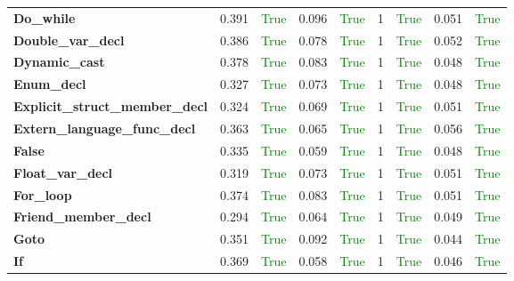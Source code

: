 \documentclass{article}
\begin{document}
\begin{xltabular}{\textwidth}{lcccccccc}
\textbf{{\fontsize{10}{12}\selectfont Do\_while}}& 0.391&\textcolor{green}{True}& 0.096&\textcolor{green}{True}& 1&\textcolor{green}{True}& 0.051&\textcolor{green}{True} \\[0.5ex]
\textbf{{\fontsize{10}{12}\selectfont Double\_var\_decl}}& 0.386&\textcolor{green}{True}& 0.078&\textcolor{green}{True}& 1&\textcolor{green}{True}& 0.052&\textcolor{green}{True} \\[0.5ex]
\textbf{{\fontsize{10}{12}\selectfont Dynamic\_cast}}& 0.378&\textcolor{green}{True}& 0.083&\textcolor{green}{True}& 1&\textcolor{green}{True}& 0.048&\textcolor{green}{True} \\[0.5ex]
\textbf{{\fontsize{10}{12}\selectfont Enum\_decl}}& 0.327&\textcolor{green}{True}& 0.073&\textcolor{green}{True}& 1&\textcolor{green}{True}& 0.048&\textcolor{green}{True} \\[0.5ex]
\textbf{{\fontsize{10}{12}\selectfont Explicit\_struct\_member\_decl}}& 0.324&\textcolor{green}{True}& 0.069&\textcolor{green}{True}& 1&\textcolor{green}{True}& 0.051&\textcolor{green}{True} \\[0.5ex]
\textbf{{\fontsize{10}{12}\selectfont Extern\_language\_func\_decl}}& 0.363&\textcolor{green}{True}& 0.065&\textcolor{green}{True}& 1&\textcolor{green}{True}& 0.056&\textcolor{green}{True} \\[0.5ex]
\textbf{{\fontsize{10}{12}\selectfont False}}& 0.335&\textcolor{green}{True}& 0.059&\textcolor{green}{True}& 1&\textcolor{green}{True}& 0.048&\textcolor{green}{True} \\[0.5ex]
\textbf{{\fontsize{10}{12}\selectfont Float\_var\_decl}}& 0.319&\textcolor{green}{True}& 0.073&\textcolor{green}{True}& 1&\textcolor{green}{True}& 0.051&\textcolor{green}{True} \\[0.5ex]
\textbf{{\fontsize{10}{12}\selectfont For\_loop}}& 0.374&\textcolor{green}{True}& 0.083&\textcolor{green}{True}& 1&\textcolor{green}{True}& 0.051&\textcolor{green}{True} \\[0.5ex]
\textbf{{\fontsize{10}{12}\selectfont Friend\_member\_decl}}& 0.294&\textcolor{green}{True}& 0.064&\textcolor{green}{True}& 1&\textcolor{green}{True}& 0.049&\textcolor{green}{True} \\[0.5ex]
\textbf{{\fontsize{10}{12}\selectfont Goto}}& 0.351&\textcolor{green}{True}& 0.092&\textcolor{green}{True}& 1&\textcolor{green}{True}& 0.044&\textcolor{green}{True} \\[0.5ex]
\textbf{{\fontsize{10}{12}\selectfont If}}& 0.369&\textcolor{green}{True}& 0.058&\textcolor{green}{True}& 1&\textcolor{green}{True}& 0.046&\textcolor{green}{True} \\[0.5ex]

\end{xltabular}
\end{document}
